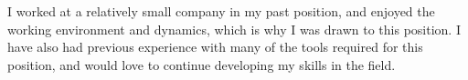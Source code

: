 \documentclass[11pt, a4paper]{awesome-cv}
\begin{document}
\begin{cvletter}
I worked at a relatively small company in my past position,
and enjoyed the working environment and dynamics, 
which is why I was drawn to this position.
I have also had previous experience with many of the tools required for this position,
and would love to continue developing my skills in the field.


\end{cvletter}
\end{document}
